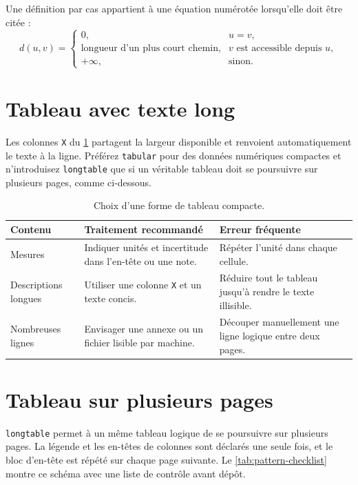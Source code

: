 Une définition par cas appartient à une équation numérotée lorsqu'elle doit être
citée :
\begin{equation}
  d(u,v)=
  \begin{cases}
    0, & u=v,\\
    \text{longueur d'un plus court chemin}, & v\text{ est accessible depuis }u,\\
    +\infty, & \text{sinon}.
  \end{cases}
  \label{eq:pattern-cases}
\end{equation}

\section{Tableau avec texte long}

Les colonnes \texttt{X} du \cref{tab:pattern-guide} partagent la largeur
disponible et renvoient automatiquement le texte à la ligne. Préférez
\texttt{tabular} pour des données numériques compactes et n'introduisez
\texttt{longtable} que si un véritable tableau doit se poursuivre sur plusieurs
pages, comme ci-dessous.

\begin{table}[htbp]
  \centering
  \caption{Choix d'une forme de tableau compacte.}
  \label{tab:pattern-guide}
  \begin{tabularx}{\linewidth}{@{}l>{\raggedright\arraybackslash}X>{\raggedright\arraybackslash}X@{}}
    \toprule
    Contenu & Traitement recommandé & Erreur fréquente \\
    \midrule
    Mesures & Indiquer unités et incertitude dans l'en-tête ou une note. & Répéter l'unité dans chaque cellule. \\
    Descriptions longues & Utiliser une colonne \texttt{X} et un texte concis. & Réduire tout le tableau jusqu'à rendre le texte illisible. \\
    Nombreuses lignes & Envisager une annexe ou un fichier lisible par machine. & Découper manuellement une ligne logique entre deux pages. \\
    \bottomrule
  \end{tabularx}
\end{table}

\section{Tableau sur plusieurs pages}

\texttt{longtable} permet à un même tableau logique de se poursuivre sur
plusieurs pages. La légende et les en-têtes de colonnes sont déclarés une seule
fois, et le bloc d'en-tête est répété sur chaque page suivante.
Le \cref{tab:pattern-checklist} montre ce schéma avec une liste de contrôle avant
dépôt.

